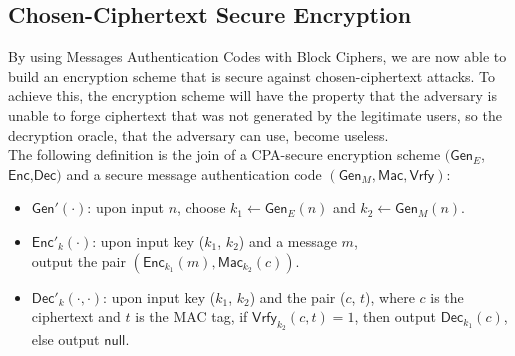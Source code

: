 \subsection{Chosen-Ciphertext Secure Encryption}
By using Messages Authentication Codes with Block Ciphers, we are now able to build an encryption scheme that is secure against chosen-ciphertext attacks. To achieve this, the encryption scheme will have the property that the adversary is unable to forge ciphertext that was not generated by the legitimate users, so the decryption oracle, that the adversary can use, become useless.\\
The following definition is the join of a CPA-secure encryption scheme $(\mathsf{Gen}_E$,\\$\mathsf{Enc}$,$\mathsf{Dec})$ and a secure message authentication code $(\mathsf{Gen}_M, \mathsf{Mac}, \mathsf{Vrfy})$:
\begin{itemize}
    \item{$\mathsf{Gen}'(\cdot)$: upon input $n$, choose $k_1 \leftarrow \mathsf{Gen}_E(n)$ and $k_2 \leftarrow \mathsf{Gen}_M(n)$.}
    \item{$\mathsf{Enc}'_k(\cdot)$: upon input key ($k_1$, $k_2$) and a message $m$,\\output the pair $(\mathsf{Enc}_{k_1}(m), \mathsf{Mac}_{k_2}(c))$.}
    \item{$\mathsf{Dec}'_k(\cdot, \cdot)$: upon input key ($k_1$, $k_2$) and the pair ($c$, $t$), where $c$ is the ciphertext and $t$ is the MAC tag, if $\mathsf{Vrfy}_{k_2}(c, t) = 1$, then output $\mathsf{Dec}_{k_1}(c)$, else output $\mathsf{null}$.}
\end{itemize}
